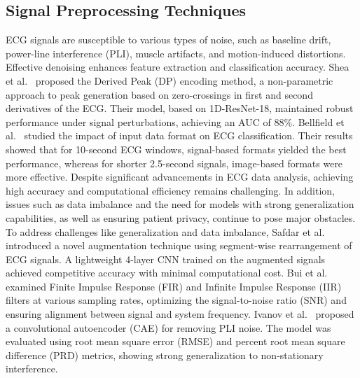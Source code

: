 \documentclass[a4paper,fleqn]{cas-dc}
\begin{document}
\subsection{Signal Preprocessing Techniques}
ECG signals are susceptible to various types of noise, such as baseline drift, power-line interference (PLI), muscle artifacts, and motion-induced distortions. Effective denoising enhances feature extraction and classification accuracy. Shea et al.~\cite{shea2024baseline} proposed the Derived Peak (DP) encoding method, a non-parametric approach to peak generation based on zero-crossings in first and second derivatives of the ECG. Their model, based on 1D-ResNet-18, maintained robust performance under signal perturbations, achieving an AUC of 88\%. Bellfield et al.~\cite{bellfield2024impact} studied the impact of input data format on ECG classification. Their results showed that for 10-second ECG windows, signal-based formats yielded the best performance, whereas for shorter 2.5-second signals, image-based formats were more effective. Despite significant advancements in ECG data analysis, achieving high accuracy and computational efficiency remains challenging. In addition, issues such as data imbalance and the need for models with strong generalization capabilities, as well as ensuring patient privacy, continue to pose major obstacles. To address challenges like generalization and data imbalance, Safdar et al.~\cite{safdar2023novel} introduced a novel augmentation technique using segment-wise rearrangement of ECG signals. A lightweight 4-layer CNN trained on the augmented signals achieved competitive accuracy with minimal computational cost. Bui et al.~\cite{bui2021comparison} examined Finite Impulse Response (FIR) and Infinite Impulse Response (IIR) filters at various sampling rates, optimizing the signal-to-noise ratio (SNR) and ensuring alignment between signal and system frequency. Ivanov et al.~\cite{ivanov2022convolutional} proposed a convolutional autoencoder (CAE) for removing PLI noise. The model was evaluated using root mean square error (RMSE) and percent root mean square difference (PRD) metrics, showing strong generalization to non-stationary interference.
\end{document}
